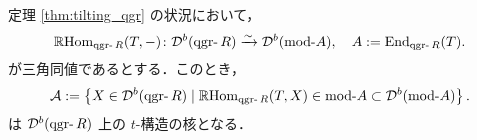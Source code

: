 \begin{prop}\cite{Ri89}
\label{prop:t_structure_from_tilting}
定理 \ref{thm:tilting_qgr} の状況において，
\[
\RHom_{\qgr R}(T, -) \colon \D^b(\qgr R) \xrightarrow{\sim} \D^b(\mod A), \quad A := \End_{\qgr R}(T).
\]
が三角同値であるとする．このとき，
\[
\A := \left\{ X \in \D^b(\qgr R) \mid \RHom_{\qgr R}(T, X) \in \mod A \subset \D^b(\mod A) \right\}.
\]
は \(\D^b(\qgr R)\) 上の \(t\)-構造の核となる．
\end{prop}

